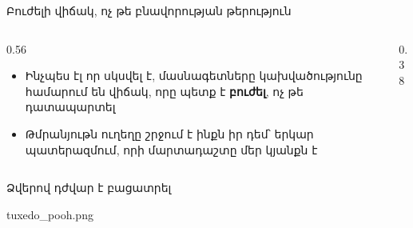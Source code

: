 \begin{frame}{Բուժելի վիճակ, ոչ թե բնավորության թերություն}
  \begin{columns}[c]
    \begin{column}{0.56\textwidth}
      \begin{itemize}
        \item Ինչպես էլ որ սկսվել է, մասնագետները կախվածությունը համարում են վիճակ, որը պետք է \textbf{բուժել}, ոչ թե դատապարտել
        \item<2-> Թմրանյութն ուղեղը շրջում է ինքն իր դեմ՝ երկար պատերազմում, որի մարտադաշտը մեր կյանքն է
      \end{itemize}
    \end{column}
    \begin{column}{0.38\textwidth}
    \end{column}
  \end{columns}
\end{frame}

\begin{frame}{Ձվերով դժվար է բացատրել}
  \centering
  \begin{meme}[7.2cm]{tuxedo_pooh.png}
  \end{meme}
\end{frame}
